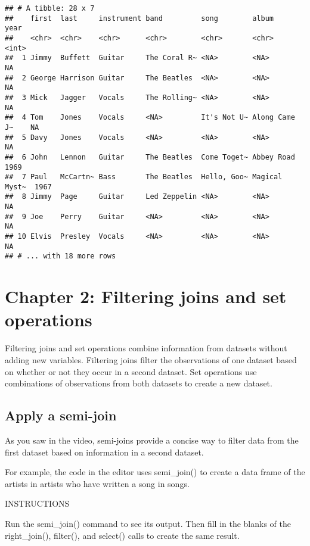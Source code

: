 \documentclass[]{article}
\begin{document}
\begin{verbatim}
## # A tibble: 28 x 7
##    first  last     instrument band         song        album          year
##    <chr>  <chr>    <chr>      <chr>        <chr>       <chr>         <int>
##  1 Jimmy  Buffett  Guitar     The Coral R~ <NA>        <NA>             NA
##  2 George Harrison Guitar     The Beatles  <NA>        <NA>             NA
##  3 Mick   Jagger   Vocals     The Rolling~ <NA>        <NA>             NA
##  4 Tom    Jones    Vocals     <NA>         It's Not U~ Along Came J~    NA
##  5 Davy   Jones    Vocals     <NA>         <NA>        <NA>             NA
##  6 John   Lennon   Guitar     The Beatles  Come Toget~ Abbey Road     1969
##  7 Paul   McCartn~ Bass       The Beatles  Hello, Goo~ Magical Myst~  1967
##  8 Jimmy  Page     Guitar     Led Zeppelin <NA>        <NA>             NA
##  9 Joe    Perry    Guitar     <NA>         <NA>        <NA>             NA
## 10 Elvis  Presley  Vocals     <NA>         <NA>        <NA>             NA
## # ... with 18 more rows
\end{verbatim}

\section{Chapter 2: Filtering joins and set
operations}\label{chapter-2-filtering-joins-and-set-operations}

Filtering joins and set operations combine information from datasets
without adding new variables. Filtering joins filter the observations of
one dataset based on whether or not they occur in a second dataset. Set
operations use combinations of observations from both datasets to create
a new dataset.

\subsection{Apply a semi-join}\label{apply-a-semi-join}

As you saw in the video, semi-joins provide a concise way to filter data
from the first dataset based on information in a second dataset.

For example, the code in the editor uses semi\_join() to create a data
frame of the artists in artists who have written a song in songs.

INSTRUCTIONS

Run the semi\_join() command to see its output. Then fill in the blanks
of the right\_join(), filter(), and select() calls to create the same
result.
\end{document}
